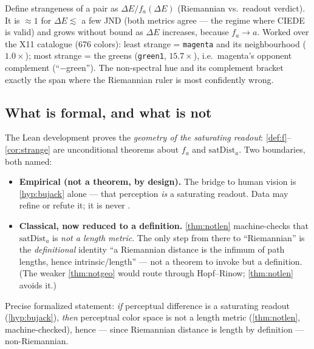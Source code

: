 \begin{corollary}\label{cor:strange}
Define strangeness of a pair as $\Delta E / f_a(\Delta E)$ (Riemannian vs.\ readout
verdict). It is $\approx 1$ for $\Delta E\lesssim$ a few JND (both metrics agree —
the regime where CIEDE is valid) and grows without bound as $\Delta E$ increases,
because $f_a\to a$. Worked over the X11 catalogue (676 colors): least strange =
\texttt{magenta} and its neighbourhood ($1.0\times$); most strange = the greens
(\texttt{green1}, $15.7\times$), i.e.\ magenta's opponent complement
(``$-$green''). The non-spectral hue and its complement bracket exactly the span
where the Riemannian ruler is most confidently wrong.
\end{corollary}

\subsection{What is formal, and what is not}
The Lean development proves the \emph{geometry of the saturating readout}:
\cref{def:f}--\cref{cor:strange} are unconditional theorems about $f_a$ and
$\mathrm{satDist}_a$. Two boundaries, both named:
\begin{itemize}
\item \textbf{Empirical (not a theorem, by design).} The bridge to human vision is
\cref{hyp:bujack} alone — that perception \emph{is} a saturating readout. Data may
refine or refute it; it is never \leanok.
\item \textbf{Classical, now reduced to a definition.} \cref{thm:notlen}
machine-checks that $\mathrm{satDist}_a$ is \emph{not a length metric}. The only
step from there to ``Riemannian'' is the \emph{definitional} identity ``a Riemannian
distance is the infimum of path lengths, hence intrinsic/length'' --- not a theorem
to invoke but a definition. (The weaker \cref{thm:notgeo} would route through
Hopf--Rinow; \cref{thm:notlen} avoids it.)
\end{itemize}
Precise formalized statement: \emph{if} perceptual difference is a saturating
readout (\cref{hyp:bujack}), \emph{then} perceptual color space is not a length
metric (\cref{thm:notlen}, machine-checked), hence --- since Riemannian distance is
length by definition --- non-Riemannian.
